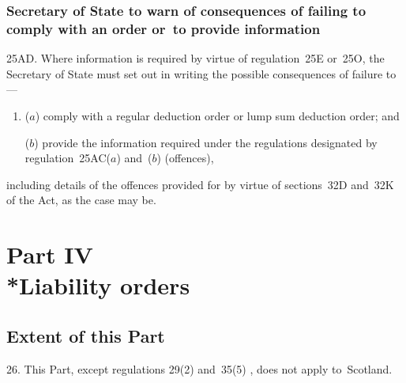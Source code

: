\documentclass[12pt,a4paper]{article}
\begin{document}
\subsubsection[25AD. 
Secretary of State  %
to warn of consequences of failing to comply with an order or~to provide information]{%
Secretary of State  %
to warn of consequences of failing to comply with an order or~to provide information}

25AD.  Where information is required by virtue of regulation~25E or~25O, the 
Secretary of State  %
must set out in writing the possible consequences of failure to—
\begin{enumerate}\item[]
($a$) comply with a regular deduction order or lump sum deduction order; and

($b$) provide the information required under the regulations designated by regulation~25AC($a$)  and~($b$)  (offences),
\end{enumerate}
including details of the offences provided for by virtue of sections~32D and~32K of the   Act, as the case may be.


\section[Part IV --- Liability orders]{Part IV\\*Liability orders}

\renewcommand\parthead{--- Part IV}

\subsection[26. Extent of this Part]{Extent of this Part}

26.  This Part, except 
regulations 29(2) and~35(5)%
, does not apply to~Scotland.

\end{document}
